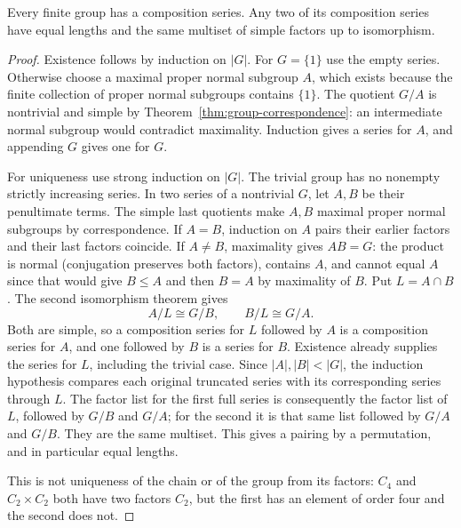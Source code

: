 \begin{theorem}\label{thm:group-jordan-holder}
Every finite group has a composition series. Any two of its composition series have equal lengths and the same multiset of simple factors up to isomorphism.
\end{theorem}
\begin{proof}
Existence follows by induction on $|G|$. For $G=\{1\}$ use the empty series. Otherwise choose a maximal proper normal subgroup $A$, which exists because the finite collection of proper normal subgroups contains $\{1\}$. The quotient $G/A$ is nontrivial and simple by Theorem~\ref{thm:group-correspondence}: an intermediate normal subgroup would contradict maximality. Induction gives a series for $A$, and appending $G$ gives one for $G$.

For uniqueness use strong induction on $|G|$. The trivial group has no nonempty strictly increasing series. In two series of a nontrivial $G$, let $A,B$ be their penultimate terms. The simple last quotients make $A,B$ maximal proper normal subgroups by correspondence. If $A=B$, induction on $A$ pairs their earlier factors and their last factors coincide. If $A\ne B$, maximality gives $AB=G$: the product is normal (conjugation preserves both factors), contains $A$, and cannot equal $A$ since that would give $B\leq A$ and then $B=A$ by maximality of $B$. Put $L=A\cap B$. The second isomorphism theorem gives
\[
 A/L\cong G/B,\qquad B/L\cong G/A.
\]
Both are simple, so a composition series for $L$ followed by $A$ is a composition series for $A$, and one followed by $B$ is a series for $B$. Existence already supplies the series for $L$, including the trivial case. Since $|A|,|B|<|G|$, the induction hypothesis compares each original truncated series with its corresponding series through $L$. The factor list for the first full series is consequently the factor list of $L$, followed by $G/B$ and $G/A$; for the second it is that same list followed by $G/A$ and $G/B$. They are the same multiset. This gives a pairing by a permutation, and in particular equal lengths.

This is not uniqueness of the chain or of the group from its factors: $C_4$ and $C_2\times C_2$ both have two factors $C_2$, but the first has an element of order four and the second does not.
\end{proof}
